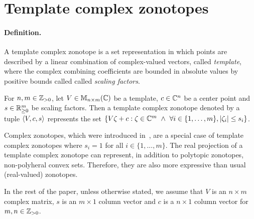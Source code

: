 \section{Template complex zonotopes}
\paragraph{\bf Definition.}
A template complex zonotope is a set representation in which points
are described by a linear combination of complex-valued vectors,
called \textit{template}, where the complex combining coefficients are
bounded in absolute values by positive bounds called called
\textit{scaling factors}.


%
\begin{defn}
  For $n,m\in\mathbb{Z}_{> 0}$, let $V\in\mathbb{M}_{n\times m}(\mathbb{C})$ be a template, $c\in\mathbb{C}^n$
  be a center point and $s\in{{\mathbb{R}}}^m_{\geq 0}$ be scaling factors.  Then
  a template complex zonotope denoted by a tuple
  $\left<V,c,s\right>$ represents the set
  $\left\{V\zeta+c:\zeta\in\mathbb{C}^m~\wedge~\forall
  i\in\{1,\ldots,m\},|\zeta_i|\leq s_i\right\}$.
\end{defn}

Complex zonotopes, which were introduced in~\cite{arvind2016lis}, are
a special case of template complex zonotopes where $s_i = 1$ for all
$i\in\{1,...,m\}$.  The real projection of a template complex zonotope
can represent, in addition to polytopic zonotopes, non-polyheral
convex sets.  Therefore, they are also more expressive than usual
(real-valued) zonotopes.  %

In the rest of the paper, unless otherwise stated, we assume that $V$
is an $n\times m$ complex matrix, $s$ is an $m\times 1$ column vector
and $c$ is a $n\times 1$ column vector for $m,n\in\mathbb{Z}_{> 0}$.

